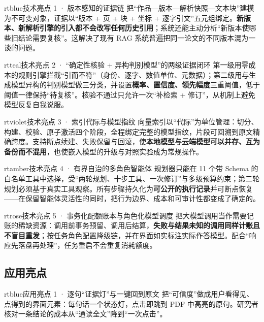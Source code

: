 \begin{innobox}{rtblue}{技术亮点 1 · 版本感知的证据链}
把“作品—版本—解析快照—文本块”建模为不可变对象，证据以“版本 + 页 + 块 + 坐标 + 逐字引文”五元组绑定。\textbf{新版本、新解析引擎的引入都不会改写任何历史引用}；系统还能主动分析“新版本使哪些旧结论需要复核”。这解决了现有 RAG 系统普遍把同一论文的不同版本混为一谈的问题。
\end{innobox}

\begin{innobox}{rtteal}{技术亮点 2 · “确定性核验 + 异构判别模型”的两级证据闭环}
第一级用零成本的规则引擎拦截“引而不符”（身份、逐字、数值单位、元数据）；第二级用与生成模型异构的判别模型做三分类，并设置\textbf{概率、置信度、领先幅度}三重阈值，低于阈值一律保持“待复核”。核验不通过只允许一次“补检索 + 修订”，从机制上避免模型反复自我说服。
\end{innobox}

\begin{innobox}{rtviolet}{技术亮点 3 · 索引代际与模型指纹}
向量索引以“代际”为单位管理：切分、构建、校验、原子激活四个阶段，全程绑定完整的模型指纹，片段可回溯到原文精确跨度。支持断点续建、失败保留与回滚，使\textbf{本地模型与云端模型可以并存、互为备份而不混用}，也使嵌入模型的升级与对照实验成为常规操作。
\end{innobox}

\begin{innobox}{rtamber}{技术亮点 4 · 有界自治的多角色智能体}
规划器只能在 11 个带 Schema 的白名单工具中选择，受“两轮规划、十步工具、一次修订”与多级预算约束；第二轮规划必须基于真实工具观察。所有步骤持久化为\textbf{可公开的执行记录}并可断点恢复——在保留智能体灵活性的同时，把行为边界、成本和可审计性都变成了确定的。
\end{innobox}

\begin{innobox}{rtrose}{技术亮点 5 · 事务化配额账本与角色化模型调度}
把大模型调用当作需要记账的稀缺资源：调用前事务预留、调用后结算，\textbf{失败与结果未知的调用同样计账且不盲目重发}；按任务角色配置降级链，并在界面如实标注实际作答模型。配合“响应先落盘再处理”，任务重启不会重复消耗额度。
\end{innobox}

\subsection{应用亮点}

\begin{innobox}{rtblue}{应用亮点 1 · 逐句“证据灯”与一键回到原文}
把“可信度”做成用户看得见、点得到的界面元素：每句话一个状态灯，点击即跳到 PDF 中高亮的原句。研究者核对一条结论的成本从“通读全文”降到“一次点击”。
\end{innobox}


